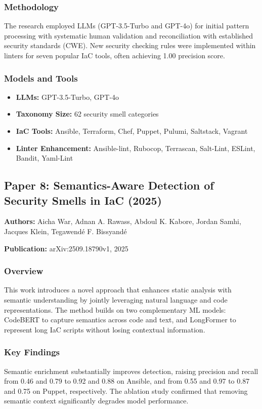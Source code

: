 \documentclass[11pt,a4paper]{article}
\begin{document}
\subsubsection{Methodology}
The research employed LLMs (GPT-3.5-Turbo and GPT-4o) for initial pattern processing with systematic human validation and reconciliation with established security standards (CWE). New security checking rules were implemented within linters for seven popular IaC tools, often achieving 1.00 precision score.

\subsubsection{Models and Tools}
\begin{itemize}
    \item \textbf{LLMs:} GPT-3.5-Turbo, GPT-4o
    \item \textbf{Taxonomy Size:} 62 security smell categories
    \item \textbf{IaC Tools:} Ansible, Terraform, Chef, Puppet, Pulumi, Saltstack, Vagrant
    \item \textbf{Linter Enhancement:} Ansible-lint, Rubocop, Terrascan, Salt-Lint, ESLint, Bandit, Yaml-Lint
\end{itemize}

\subsection{Paper 8: Semantics-Aware Detection of Security Smells in IaC (2025)}

\textbf{Authors:} Aicha War, Adnan A. Rawass, Abdoul K. Kabore, Jordan Samhi, Jacques Klein, Tegawendé F. Bissyandé

\textbf{Publication:} arXiv:2509.18790v1, 2025

\subsubsection{Overview}
This work introduces a novel approach that enhances static analysis with semantic understanding by jointly leveraging natural language and code representations. The method builds on two complementary ML models: CodeBERT to capture semantics across code and text, and LongFormer to represent long IaC scripts without losing contextual information.

\subsubsection{Key Findings}
Semantic enrichment substantially improves detection, raising precision and recall from 0.46 and 0.79 to 0.92 and 0.88 on Ansible, and from 0.55 and 0.97 to 0.87 and 0.75 on Puppet, respectively. The ablation study confirmed that removing semantic context significantly degrades model performance.
\end{document}
